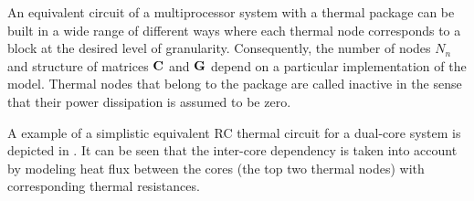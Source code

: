 An equivalent circuit of a multiprocessor system with a thermal package can be built in a wide range of different ways where each thermal node corresponds to a block at the desired level of granularity. Consequently, the number of nodes $N_n$ and structure of matrices $\mathbf{C}$ and $\mathbf{G}$ depend on a particular implementation of the model. Thermal nodes that belong to the package are called inactive in the sense that their power dissipation is assumed to be zero.

A example of a simplistic equivalent RC thermal circuit for a dual-core system is depicted in . It can be seen that the inter-core dependency is taken into account by modeling heat flux between the cores (the top two thermal nodes) with corresponding thermal resistances.
